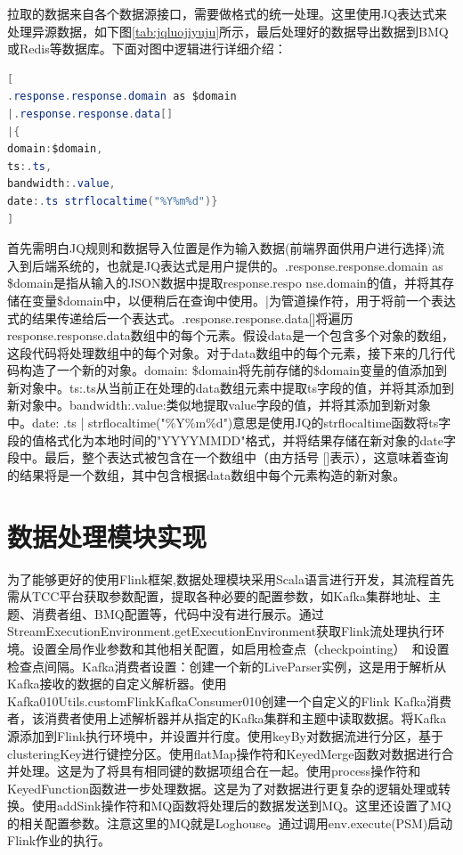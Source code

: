 \begin{longtable}[htbp]
拉取的数据来自各个数据源接口，需要做格式的统一处理。这里使用JQ表达式来处理异源数据，如下图\ref{tab:jqluojiyuju}所示，最后处理好的数据导出数据到BMQ或Redis等数据库。下面对图中逻辑进行详细介绍：

\begin{lrbox}{\jqluojiyuju}  
\begin{lstlisting}[language=Java]  
[
.response.response.domain as $domain
|.response.response.data[]
|{
domain:$domain,
ts:.ts,
bandwidth:.value,
date:.ts strflocaltime("%Y%m%d")}
] 
\end{lstlisting}  
\end{lrbox} 
\begin{table}[h]   
\caption{JQ逻辑语句}  
\label{tab:jqluojiyuju}  
\usebox{\jqluojiyuju}  
\end{table}  

首先需明白JQ规则和数据导入位置是作为输入数据(前端界面供用户进行选择)流入到后端系统的，也就是JQ表达式是用户提供的。.response.response.domain as \$domain是指从输入的JSON数据中提取response.respo \linebreak nse.domain的值，并将其存储在变量\$domain中，以便稍后在查询中使用。|为管道操作符，用于将前一个表达式的结果传递给后一个表达式。.response.response.data[]将遍历response.response.data数组中的每个元素。假设data是一个包含多个对象的数组，这段代码将处理数组中的每个对象。对于data数组中的每个元素，接下来的几行代码构造了一个新的对象。domain: \$domain将先前存储的\$domain变量的值添加到新对象中。ts:.ts从当前正在处理的data数组元素中提取ts字段的值，并将其添加到新对象中。bandwidth:.value:类似地提取value字段的值，并将其添加到新对象中。date: .ts | strflocaltime("\%Y\%m\%d")意思是使用JQ的strflocaltime函数将ts字段的值格式化为本地时间的"YYYYMMDD"格式，并将结果存储在新对象的date字段中。最后，整个表达式被包含在一个数组中（由方括号 []表示），这意味着查询的结果将是一个数组，其中包含根据data数组中每个元素构造的新对象。

\section{数据处理模块实现}

为了能够更好的使用Flink框架,数据处理模块采用Scala语言进行开发，其流程首先需从TCC平台获取参数配置，提取各种必要的配置参数，如Kafka集群地址、主题、消费者组、BMQ配置等，代码中没有进行展示。通过StreamExecutionEnvironment.getExecutionEnvironment获取Flink流处理执行环境。设置全局作业参数和其他相关配置，如启用检查点（checkpointing）~\cite{王攀峰2009并行复算}和设置检查点间隔。Kafka消费者设置：创建一个新的LiveParser实例，这是用于解析从Kafka接收的数据的自定义解析器。使用Kafka010Utils.customFlinkKafkaConsumer010创建一个自定义的Flink Kafka消费者，该消费者使用上述解析器并从指定的Kafka集群和主题中读取数据。将Kafka源添加到Flink执行环境中，并设置并行度。使用keyBy对数据流进行分区，基于clusteringKey进行键控分区。使用flatMap操作符和KeyedMerge函数对数据进行合并处理。这是为了将具有相同键的数据项组合在一起。使用process操作符和KeyedFunction函数进一步处理数据。这是为了对数据进行更复杂的逻辑处理或转换。使用addSink操作符和MQ函数将处理后的数据发送到MQ。这里还设置了MQ的相关配置参数。注意这里的MQ就是Loghouse。通过调用env.execute(PSM)启动Flink作业的执行。


\end{longtable}
